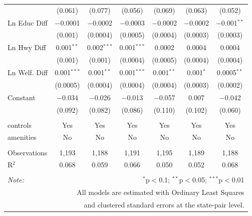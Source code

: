 \begin{table}[!htbp]
\begin{tabular}{@{\extracolsep{5pt}}lcccccc}
  & (0.061) & (0.077) & (0.056) & (0.069) & (0.063) & (0.052) \\ 
  Ln Educ Diff & $-$0.0001 & $-$0.0002 & $-$0.0003 & $-$0.0002 & $-$0.0002 & $-$0.001$^{**}$ \\ 
  & (0.001) & (0.0004) & (0.0005) & (0.0004) & (0.0003) & (0.0003) \\ 
  Ln Hwy Diff & 0.001$^{**}$ & 0.002$^{***}$ & 0.001$^{***}$ & 0.0002 & 0.0004 & 0.0004 \\ 
  & (0.001) & (0.001) & (0.0004) & (0.0005) & (0.0004) & (0.0004) \\ 
  Ln Welf. Diff & 0.001$^{***}$ & 0.001$^{**}$ & 0.001$^{***}$ & 0.001$^{**}$ & 0.001$^{*}$ & 0.0005$^{**}$ \\ 
  & (0.0005) & (0.0004) & (0.0004) & (0.0004) & (0.0003) & (0.0002) \\ 
  Constant & $-$0.034 & $-$0.026 & $-$0.013 & $-$0.057 & 0.007 & $-$0.042 \\ 
  & (0.092) & (0.082) & (0.086) & (0.110) & (0.102) & (0.060) \\ 
 \hline \\[-1.8ex] 
controls & Yes & Yes & Yes & Yes & Yes & Yes \\ 
amenities & No & No & No & No & No & No \\ 
\hline \\[-1.8ex] 
Observations & 1,193 & 1,188 & 1,191 & 1,195 & 1,189 & 1,188 \\ 
R$^{2}$ & 0.068 & 0.059 & 0.066 & 0.050 & 0.052 & 0.068 \\ 
\hline 
\hline \\[-1.8ex] 
\textit{Note:}  & \multicolumn{6}{r}{$^{*}$p$<$0.1; $^{**}$p$<$0.05; $^{***}$p$<$0.01} \\ 
 & \multicolumn{6}{r}{All models are estimated with Ordinary Least Squares} \\ 
 & \multicolumn{6}{r}{and clustered standard errors at the state-pair level.} \\ 
\end{tabular} 
\end{table} 
